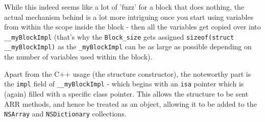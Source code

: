 While this indeed seems like a lot of 'fuzz' for a block that does nothing, the actual mechanism behind is a lot more intriguing once you start using variables from within the scope inside the block - then all the variables get copied over into \verb=__myBlockImpl= (that's why the \verb=Block_size= gets assigned \verb=sizeof(=\verb=struct= \verb=__myBlockImpl)= as the \verb=_myBlockImpl= can be as large as possible depending on the number of variables used within the block).

Apart from the C++ usage (the structure constructor), the noteworthy part is the \verb=impl= field of \verb=__myBlockImpl= - which begins with an \verb=isa= pointer which is (again) filled with a specific class pointer. This allows the structure to be sent ARR methods, and hence be treated as an object, allowing it to be added to the \verb=NSArray= and \verb=NSDictionary= collections.
